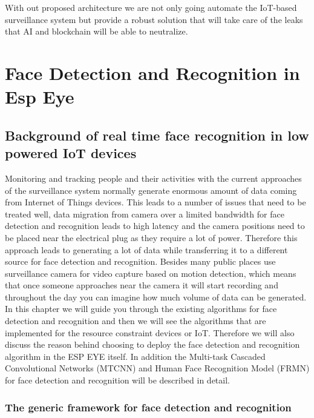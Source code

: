 With out proposed architecture we are not only going automate the IoT-based surveillance system but provide a robust solution that will take care of the leaks that AI and blockchain will be able to neutralize. 


\chapter{Face Detection and Recognition in Esp Eye}
\label{chap:face_detection}
\section{Background of real time face recognition in low powered IoT devices}
Monitoring and tracking people and their activities with the current approaches of the surveillance system normally generate enormous amount of data coming from Internet of Things devices. This leads to a number of issues that need to be treated well, data migration from camera over a limited bandwidth for face detection and recognition leads to high latency  and the camera positions need to be placed near the electrical plug as they require a lot of power. Therefore this approach leads to generating a lot of data while transferring it to a different source for face detection and recognition. Besides many public places use surveillance camera for video capture based on motion detection, which means that once someone approaches near the camera it will start recording and throughout the day you can imagine how much volume of data can be generated. 
In this chapter we will guide you through the existing algorithms for face detection and recognition and then we will see the algorithms that are implemented for the resource constraint devices or IoT. Therefore we will also discuss the reason behind choosing to deploy the face detection and recognition algorithm in the ESP EYE itself. In addition the Multi-task Cascaded Convolutional Networks (MTCNN) and  Human Face Recognition Model (FRMN) for face detection and recognition will be described in detail. 


\subsection{The generic framework for face detection and recognition}


